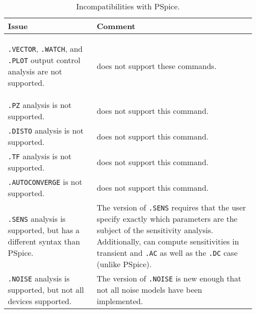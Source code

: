 



\begin{longtable}[h] {>{\raggedright\small}m{2in}|>{\raggedright\let\\\tabularnewline\small}m{4in}}
  \caption{Incompatibilities with PSpice.} \\ \hline
  \rowcolor{XyceDarkBlue}
  \color{white}\bf Issue & 
  \color{white}\bf Comment \\ \hline \endfirsthead
  \label{Incompat_PS}

\texttt{.VECTOR}, \texttt{.WATCH}, and \texttt{.PLOT}  output 
control analysis are not supported. & \Xyce{} does 
not support these commands.  \\ \hline


\texttt{.PZ} analysis is not supported. & \Xyce{} does not support this command.  
\\ \hline


\texttt{.DISTO} analysis is not supported. & \Xyce{} does not support this command.  
\\ \hline

\texttt{.TF} analysis is not supported. & \Xyce{} does not support this command.  
\\ \hline

\texttt{.AUTOCONVERGE} is not supported. & \Xyce{} does not support this command.  
\\ \hline

\texttt{.SENS} analysis is supported, but has a different syntax than PSpice. & The \Xyce{} version of \texttt{.SENS} requires that the user specify exactly which parameters are the subject of the sensitivity analysis.  Additionally, \Xyce{} can compute sensitivities in transient and \texttt{.AC} as well as the \texttt{.DC} case (unlike PSpice).
\\ \hline

\texttt{.NOISE} analysis is supported, but not all devices supported. & The \Xyce{} version of \texttt{.NOISE} is new enough that not all noise models have been implemented.
\\ \hline


\end{longtable}
